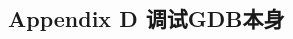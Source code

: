 \documentclass[class=book, crop=false]{standalone}
\begin{document}
\begin{CJK}{UTF8}{gbsn}

\chapter*{Appendix D 调试GDB本身}



\cleardoublepage

\end{CJK}
\end{document}
